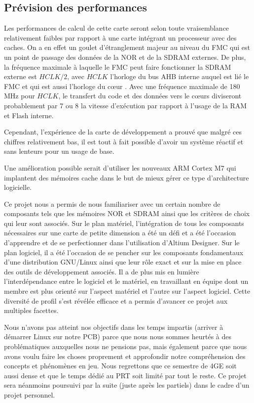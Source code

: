 \subsection{Prévision des performances}
Les performances de calcul de cette carte seront selon toute vraisemblance relativement faibles par rapport à une carte intégrant un processeur avec des caches.
On a en effet un goulet d'étranglement majeur au niveau du \gls{FMC} qui est un point de passage des données de la NOR et de la SDRAM externes.
De plus, la fréquence maximale à laquelle le \gls{FMC} peut faire fonctionner la SDRAM externe est $HCLK/2$, avec $HCLK$ l'horloge du bus \gls{AHB} interne auquel est lié le \gls{FMC} et qui est aussi l'horloge du cœur \autocite{STM:ReferenceManual}.
Avec une fréquence maximale de 180 MHz pour $HCLK$, le transfert du code et des données vers le cœurs diviseront probablement par 7 ou 8 la vitesse d'exécution par rapport à l'usage de la RAM et Flash interne.
        
Cependant, l'expérience de la carte de développement a prouvé que malgré ces chiffres relativement bas, il est tout à fait possible d'avoir un système réactif et sans lenteurs pour un usage de base.
        
Une amélioration possible serait d'utiliser les nouveaux ARM Cortex M7 qui implantent des mémoires cache dans le but de mieux gérer ce type d'architecture logicielle.


Ce projet nous a permis de nous familiariser avec un certain nombre de composants tels que les mémoires NOR et SDRAM ainsi que les critères de choix qui leur sont associés.
Sur le plan matériel, l'intégration de tous les composants nécessaires sur une carte de petite dimension a été un défi et a été l'occasion d'apprendre et de se perfectionner dans l'utilisation d'Altium Designer.
Sur le plan logiciel, il a été l'occasion de se pencher sur les composants fondamentaux d'une distribution GNU/Linux ainsi que leur rôle exact et sur la mise en place des outils de développement associés.
Il a de plus mis en lumière l'interdépendance entre le logiciel et le matériel, en travaillant en équipe dont un membre est plus orienté sur l'aspect matériel et l'autre sur l'aspect logiciel.
Cette diversité de profil s'est révélée efficace et a permis d'avancer ce projet aux multiples facettes.

Nous n'avons pas atteint nos objectifs dans les temps impartis (arriver à démarrer Linux sur notre \gls{PCB}) parce que nous nous sommes heurtés à des problématiques auxquelles nous ne pensions pas, mais également parce que nous avons voulu faire les choses proprement et approfondir notre compréhension des concepts et phénomènes en jeu.
Nous regrettons que ce semestre de 4GE soit aussi dense et que le temps dédié au PRT soit limité par tout le reste.
Ce projet sera néanmoins poursuivi par la suite (juste après les partiels) dans le cadre d'un projet personnel.

